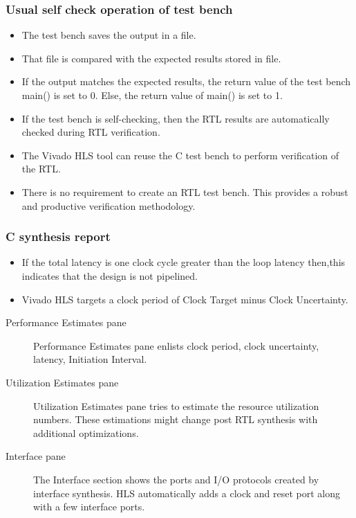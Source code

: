 \subsubsection{Usual self check operation of test bench}
\begin{itemize}
    \item The test bench saves the output in a file.
    \item That file is compared with the expected results stored in file.
    \item If the output matches the expected results, the return value of the test bench main() is set to 0. Else, the
    return value of main() is set to 1.
    \item If the test bench is self-checking, then the RTL results
    are automatically checked during RTL verification.
    \item The Vivado HLS tool can reuse the C test bench to perform verification of the RTL.
    \item There is no requirement to create an RTL test bench. This
    provides a robust and productive verification methodology.
\end{itemize}

\subsubsection{C synthesis report}
\begin{itemize}
    \item If the total latency is one clock cycle greater than the loop latency then,this indicates that the design is not pipelined.
    \item Vivado HLS targets a clock period of Clock Target minus Clock Uncertainty.
\end{itemize}

\begin{description}
    \item[Performance Estimates pane] 
    Performance Estimates pane enlists clock period, clock uncertainty, latency, Initiation Interval.
    \item[Utilization Estimates pane]
    Utilization Estimates pane tries to estimate the resource utilization numbers. These estimations might change post RTL synthesis with additional optimizations.
    \item[Interface pane] The Interface section shows the ports and I/O protocols created by interface synthesis. HLS automatically adds a clock and reset port along with a few interface ports.
\end{description}

